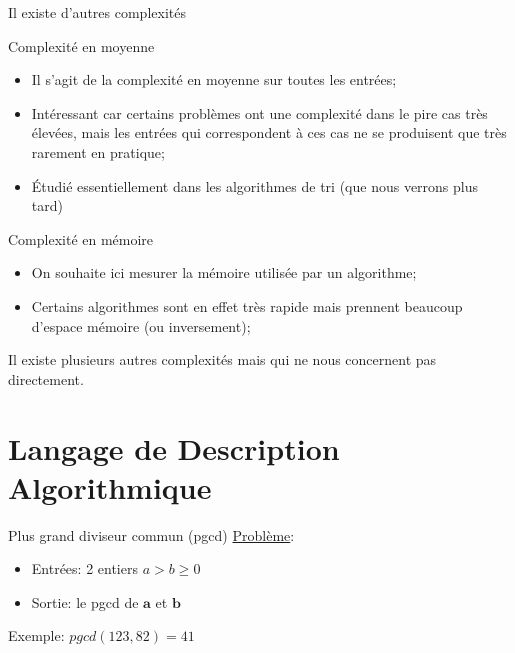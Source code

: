\documentclass[10pt,xcolor=dvipsnames]{beamer}
\begin{document}
\begin{frame}{Il existe d'autres complexités}
    \begin{alertblock}{Complexité en moyenne}
    \begin{itemize}
        \item Il s'agit de la complexité en moyenne sur toutes les entrées;
        \item Intéressant car certains problèmes ont une complexité dans le pire cas très élevées, mais les entrées qui correspondent à ces cas ne se produisent que très rarement en pratique;
        \item Étudié essentiellement dans les algorithmes de tri (que nous verrons plus tard)
    \end{itemize}
    \end{alertblock}
    
        \begin{alertblock}{Complexité en mémoire}
    \begin{itemize}
        \item On souhaite ici mesurer la mémoire utilisée par un algorithme;
        \item Certains algorithmes sont en effet très rapide mais prennent beaucoup d'espace mémoire (ou inversement);
    \end{itemize}
    \end{alertblock}
    
    \begin{center}
        Il existe plusieurs autres complexités mais qui ne nous concernent pas directement.
    \end{center}
\end{frame}

\section{Langage de Description Algorithmique}


\begin{frame}{Plus grand diviseur commun (pgcd)}
  \underline{Problème}:
  \begin{itemize}
  \item Entrées: 2 entiers $a>b \geq 0$
  \item Sortie: le  pgcd de $\mathbf{a}$ et $\mathbf{b}$
  \end{itemize}
  Exemple: $     pgcd(123,82) = 41$  \\~\\
  ~\\
  
\end{frame}
\end{document}
